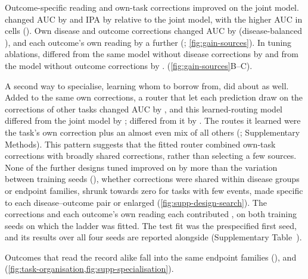 \FloatBarrier
{}
Outcome-specific reading and own-task corrections improved on the joint model.
\opera{}
changed AUC by  and IPA by  relative to the
joint model, with the higher AUC in  cells
(). Own disease and outcome corrections changed AUC by
 (disease-balanced ),
and each outcome's own reading by a further 
(; \cref{fig:gain-sources}).
In tuning ablations, \opera{} differed from the same model without disease
corrections by  and from the model without outcome
corrections by .  (\cref{fig:gain-sources}B--C).

A second way to specialise, learning whom to borrow from, did about as well.
Added to the same own corrections, a router that let each prediction draw on
the corrections of other tasks changed AUC by , and this
learned-routing model differed from the joint model by ;
\opera{} differed from it by . The routes it learned were the
task's own correction plus an almost even mix of all others
(; Supplementary Methods). This pattern
suggests that the fitted router combined own-task corrections with broadly
shared corrections, rather than selecting a few sources. None of the further designs tuned
improved on \opera{} by more than the variation between training seeds
(), whether corrections were shared within
disease groups or endpoint families, shrunk towards zero for tasks with few
events, made specific to each disease--outcome pair or enlarged
(\cref{fig:supp-design-search}). The corrections and each outcome's own
reading each contributed ,
on both training seeds on which the ladder was fitted. The test fit was the
prespecified first seed, and its results over all four seeds are reported
alongside (Supplementary Table~).

Outcomes that read the record alike  fall into the
same endpoint families (), and  (\cref{fig:task-organisation,fig:supp-specialisation}).

